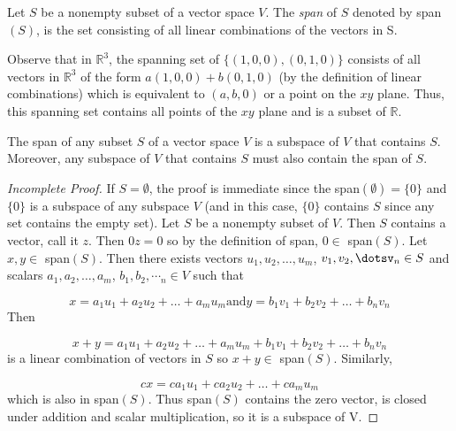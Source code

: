 \begin{definition}
		Let \(S\) be a nonempty subset of a vector space \(V\). The \textit{span} of \(S\) denoted by span\((S)\), is the set consisting of all linear combinations of the vectors in S.

\end{definition}

	Observe that in \(\mathbb{R}^{3}\), the spanning set of \(\{(1,0,0),(0,1,0)\}\) consists of all vectors in \(\mathbb{R}^{3}\) of the form \(a(1,0,0)+b(0,1,0)\) (by the definition of linear combinations) which is equivalent to \((a,b,0)\) or a point on the \(xy\) plane. Thus, this spanning set contains all points of the \(xy\) plane and is a subset of \(\mathbb{R}\).


\begin{theorem}
		The span of any subset \(S\) of a vector space \(V\) is a subspace of \(V\) that contains \(S\). Moreover, any subspace of \(V\) that contains \(S\) must also contain the span of \(S\).


\begin{proof}[Incomplete Proof]
			If \(S = \emptyset\), the proof is immediate since the span\((\emptyset) = \{0\}\) and \(\{0\}\) is a subspace of any subspace \(V\) (and in this case, \(\{0\}\) contains \(S\) since any set contains the empty set). Let \(S\) be a nonempty subset of \(V\). Then \(S\) contains a vector, call it \(z\). Then \(0z = 0\) so by the definition of span, \(0\in\) span\((S)\). Let \(x,y\in\) span\((S)\). Then there exists vectors \(u_{1},u_{2},\dots,u_{m}\), \(v_{1},v_{2},\dotsv_{n}\in S\) and scalars \(a_{1},a_{2},\dots,a_{m}\), \(b_{1},b_{2},\dotsb_{n}\in V\) such that

\[
x = a_{1}u_{1} + a_{2}u_{2} +\dots+ a_{m}u_{m} \text{and} y = b_{1}v_{1} + b_{2}v_{2} +\dots+ b_{n}v_{n}
\]
			Then

\[
x + y = a_{1}u_{1} + a_{2}u_{2} +\dots+ a_{m}u_{m} + b_{1}v_{1}+b_{2}v_{2} +\dots+ b_{n}v_{n}
\]
			is a linear combination of vectors in \(S\) so \(x + y \in\) span\((S)\). Similarly,

\[
cx = ca_{1}u_{1} + ca_{2}u_{2} +\dots+ ca_{m}u_{m}
\]
			which is also in span\((S)\). Thus span\((S)\) contains the zero vector, is closed under addition and scalar multiplication, so it is a subspace of V.

\end{proof}

\end{theorem}


